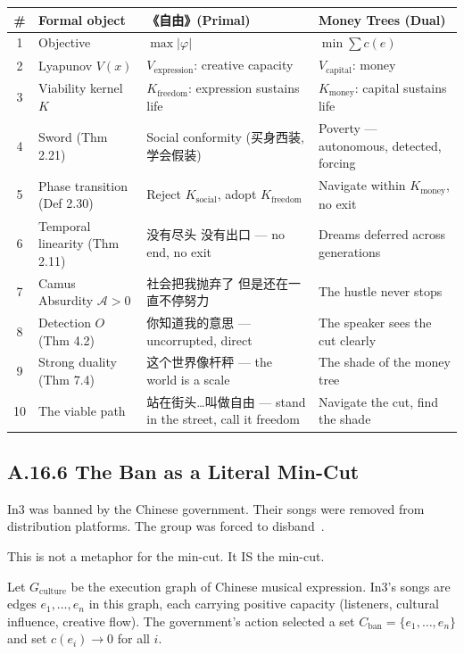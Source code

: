 \documentclass[11pt,a4paper]{article}
\theoremstyle{definition}
\theoremstyle{remark}
\begin{document}
\begin{table}[H]
\centering
\footnotesize
\begin{tabularx}{\textwidth}{c >{\raggedright\arraybackslash}p{3.2cm} X X}
\toprule
\# & \textbf{Formal object} & \textbf{《自由》(Primal) \cite{in3}} & \textbf{Money Trees (Dual) \cite{lamar2012}} \\
\midrule
1 & Objective & $\max |\varphi|$ & $\min \sum c(e)$ \\
2 & Lyapunov $V(x)$ & $V_{\text{expression}}$: creative capacity & $V_{\text{capital}}$: money \\
3 & Viability kernel $K$ & $K_{\text{freedom}}$: expression sustains life & $K_{\text{money}}$: capital sustains life \\
4 & Sword (Thm 2.21) & Social conformity (买身西装, 学会假装) & Poverty --- autonomous, detected, forcing \\
5 & Phase transition (Def 2.30) & Reject $K_{\text{social}}$, adopt $K_{\text{freedom}}$ & Navigate within $K_{\text{money}}$, no exit \\
6 & Temporal linearity (Thm 2.11) & 没有尽头 没有出口 --- no end, no exit & Dreams deferred across generations \\
7 & Camus Absurdity $\mathcal{A} > 0$ & 社会把我抛弃了 但是还在一直不停努力 & The hustle never stops \\
8 & Detection $O$ (Thm 4.2) & 你知道我的意思 --- uncorrupted, direct & The speaker sees the cut clearly \\
9 & Strong duality (Thm 7.4) & 这个世界像杆秤 --- the world is a scale & The shade of the money tree \\
10 & The viable path & 站在街头\ldots 叫做自由 --- stand in the street, call it freedom & Navigate the cut, find the shade \\
\bottomrule
\end{tabularx}
\end{table}


\subsection{A.16.6 The Ban as a Literal Min-Cut}

In3 was banned by the Chinese government. Their songs were removed from distribution platforms. The group was forced to disband~\cite{in3}.

This is not a metaphor for the min-cut. It IS the min-cut.

Let $G_{\text{culture}}$ be the execution graph of Chinese musical expression. In3's songs are edges $e_1, \ldots, e_n$ in this graph, each carrying positive capacity (listeners, cultural influence, creative flow). The government's action selected a set $C_{\text{ban}} = \{e_1, \ldots, e_n\}$ and set $c(e_i) \to 0$ for all $i$.
\end{document}
